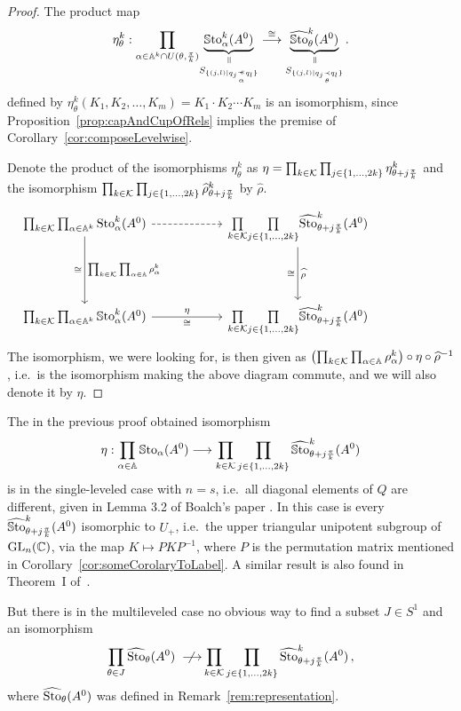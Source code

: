 \begin{proof}
  The product map
  \[
    \eta_\theta^k:
    \underset{\alpha\in\A^k\cap U(\theta,\frac{\pi}{k})}\prod
    \underset{S_{\{(j,l)\mid q_j\myrel{\alpha}q_l\}}}{%
      \underset{\text{\rotatebox[origin=c]{-90}{$=$}}}{\underbrace{%
          \SSto_\alpha^k(A^0)}}}
    \overset{\cong}{\longrightarrow}
    \underset{S_{\{(j,l) \mid q_j \underset{\theta}{\prec} q_l \}}}{%
      \underset{\text{\rotatebox[origin=c]{-90}{$=$}}}{\underbrace{%
          \hat\SSto_\theta^k(A^0)}}}
    \,.
  \]
  defined by $\eta_\theta^k(K_1,K_2,\dots,K_m) = K_1\cdot K_2\cdots K_m$ is an
  isomorphism, since Proposition~\ref{prop:capAndCupOfRels} implies the premise
  of Corollary~\ref{cor:composeLevelwise}.

  Denote the product of the isomorphisms $\eta_\theta^k$ as $\eta=
  \prod_{k\in\mathcal{K}}\prod_{j\in\{1,\dots,2k\}}
  \eta_{\theta+j\frac{\pi}{k}}^k$ and the isomorphism
  $\prod_{k\in\mathcal{K}}\prod_{j\in\{1,\dots,2k\}}\widehat\rho_{\theta+j\frac{\pi}{k}}^k$
  by $\hat\rho$.
  \[ \begin{tikzcd}[column sep=2cm,row sep=1.5cm]
    \prod_{k\in\cK}\prod_{\alpha\in\A^k}\Sto_\alpha^k(A^0)
    \rar[dashed]
    \arrow[d,"\prod_{k\in\cK}\prod_{\alpha\in\A}\rho_{\alpha}^k","\cong"']&
    \underset{k\in\cK}{\prod}\underset{j\in\{1,\dots,2k\}}{\prod}
    \hat\Sto_{\theta+j\frac{\pi}{k}}^k(A^0)
    \arrow[d,"\hat\rho","\cong"']&
    \\
    \prod_{k\in\cK}\prod_{\alpha\in\A^k}\SSto_\alpha^k(A^0)
    \arrow[r,"\eta","\cong"']&
    \underset{k\in\cK}{\prod}\underset{j\in\{1,\dots,2k\}}{\prod}
    \hat\SSto_{\theta+j\frac{\pi}{k}}^k(A^0)
  \end{tikzcd} \]
  The isomorphism, we were looking for, is then given as
  $\bigl(\prod_{k\in\mathcal{K}}\prod_{\alpha\in\mathbb{A}}\rho_{\alpha}^k\bigr)
  \circ \eta \circ \widehat\rho^{-1}$, i.e.\ is the isomorphism making the above
  diagram commute, and we will also denote it by $\eta$.
\end{proof}
\begin{rem}
  The in the previous proof obtained isomorphism
  \[
    \eta: \prod_{\alpha\in\mathbb{A}}\operatorname{\mathbb{S}to}_{\alpha}(A^0) \longrightarrow
    \prod_{k\in\mathcal{K}} \prod_{j\in\{1,\dots,2k\}}
    \widehat{\operatorname{\mathbb{S}to}}_{\theta+j\frac{\pi}{k}}^k(A^0)
  \]
  is in the single-leveled case with $n=s$, i.e.\ all diagonal elements of $Q$
  are different, given in Lemma 3.2 of Boalch's paper \cite[Lem.3.2]{boalch}.
  In this case is every $\widehat{\operatorname{\mathbb{S}to}}_{\theta+j\frac{\pi}{k}}^k(A^0)$ isomorphic to
  $U_+$, i.e.\ the upper triangular unipotent subgroup of $\operatorname{GL}_n(\mathbb{C})$, via the
  map $K\mapsto PKP^{-1}$, where $P$ is the permutation matrix mentioned in
  Corollary~\ref{cor:someCorolaryToLabel}.
  A similar result is also found in Theorem~I of~\cite{BJL1979Birkhoff}.
\end{rem}
But there is in the multileveled case no obvious way to find a subset $J\in S^1$
and an isomorphism
\[
  \prod_{\theta\in J} \widehat{\operatorname{Sto}}_{\theta}(A^0)
  ~~\not{\!\!\!\!\longrightarrow}
  \prod_{k\in\mathcal{K}}\prod_{j\in\{1,\dots,2k\}}
  \widehat{\operatorname{Sto}}_{\theta+j\frac{\pi}{k}}^k(A^0)\,,
\]
where $\widehat{\operatorname{Sto}}_{\theta}(A^0)$ was defined in Remark~\ref{rem:representation}.

